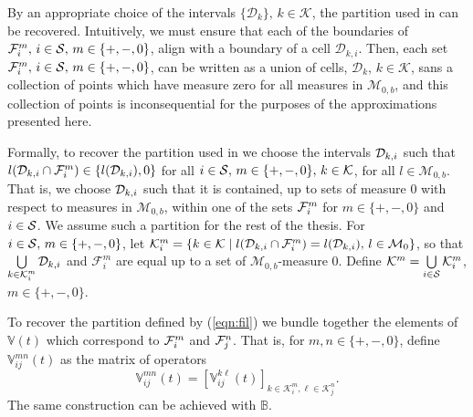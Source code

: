 By an appropriate choice of the intervals \(\{\mathcal D_k\},\, k\in\mathcal K\), the partition used in \cite{bo2014} can be recovered. Intuitively, we must ensure that each of the boundaries of \(\mathcal{F}_i^m,\, i\in\mathcal{S},\,m\in\{+,-,0\}\), align with a boundary of a cell \(\mathcal D_{k,i}\). Then, each set \(\mathcal{F}_i^m,\, i\in\mathcal{S},\,m\in\{+,-,0\}\), can be written as a union of cells, \(\mathcal D_k,\,k\in\mathcal K\), sans a collection of points which have measure zero for all measures in \(\mathcal M_{0,b}\), and this collection of points is inconsequential for the purposes of the approximations presented here. 

Formally, to recover the partition used in \citep{bo2014} we choose the intervals \(\mathcal{D}_{k,i}\) such that \(   l (\mathcal{D}_{k,i}\cap\mathcal{F}_i^m) \in \{   l (\mathcal{D}_{k,i}), 0\}\) for all \(i\in\mathcal{S},\,m\in\{+,-,0\},\,k\in\mathcal K\), for all \( l \in\mathcal M_{0,b}\). That is, we choose \(\mathcal{D}_{k,i}\) such that it is contained, up to sets of measure 0 with respect to measures in \(\mathcal M_{0,b}\), within one of the sets \(\mathcal{F}_i^m\) for \(m\in\{+,-,0\}\) and \(i\in\mathcal{S}\). We assume such a partition for the rest of the thesis. For \(i\in\mathcal{S},\,m\in\{+,-,0\}\), let \(\mathcal K^m_i = \{k\in\mathcal K\mid  l (\mathcal{D}_{k,i}\cap\mathcal{F}_i^m) =   l (\mathcal{D}_{k,i}),\,l\in\mathcal M_0 \}\), so that \(\bigcup\limits_{k\in\mathcal K_i^m} \mathcal{D}_{k,i}\) and \(\mathcal F_i^m\) are equal up to a set of \(\mathcal M_{0,b}\)-measure 0. Define \(\mathcal K^m = \bigcup\limits_{i\in\mathcal{S}}\mathcal K_i^m\), \(m\in\{+,-,0\}\). 

To recover the partition defined by (\ref{eqn:fil}) we bundle together the elements of \(\mathbb V(t)\) which correspond to \(\mathcal{F}_i^m\) and \(\mathcal{F}_j^n\). That is, for \(m,n\in\{+,-,0\}\), define \(\mathbb V_{ij}^{m n}(t)\) as the matrix of operators 
\[\mathbb V_{ij}^{m n}(t) = \left[\mathbb V_{ij}^{k \ell}(t)\right]_{k\in\mathcal K_i^m,\ell\in\mathcal K_j^n}.\] 
The same construction can be achieved with \(\mathbb B\). 

